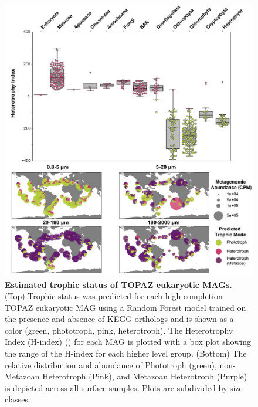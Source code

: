 \documentclass[12pt]{article}
\numberwithin{equation}{section}
\begin{document}
\begin{figure}[h!]    
    \centering
    \includegraphics[width = 0.9\columnwidth]{figures/Figure4_Trophic_Mode_v2-01.png}
    \caption{\textbf{Estimated trophic status of TOPAZ eukaryotic MAGs.} (Top) Trophic status was predicted for each high-completion TOPAZ eukaryotic MAG using a Random Forest model trained on the presence and absence of KEGG orthologs and is shown as a color (green, phototroph, pink, heterotroph). The Heterotrophy Index (H-index) () for each MAG is plotted with a box plot showing the range of the H-index for each higher level group. (Bottom) The relative distribution and abundance of Phototroph (green), non-Metazoan Heterotroph (Pink), and Metazoan Heterotroph (Purple) is depicted across all surface samples. Plots are subdivided by size classes. }
    \label{fig:fig4-trophy}
\end{figure}
\end{document}
